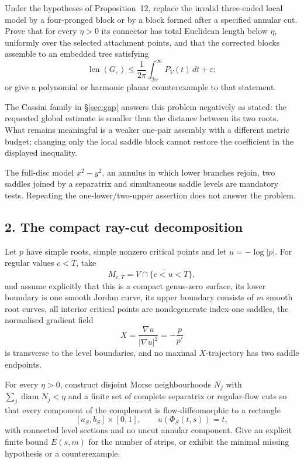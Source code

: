 \begin{problem}\label{prob:saddle1041}
Under the hypotheses of Proposition~12, replace the invalid three-ended local
model by a four-pronged block or by a block formed after a specified annular
cut.  Prove that for every $\eta>0$ its connector has total Euclidean length
below $\eta$, uniformly over the selected attachment points, and that the
corrected blocks assemble to an embedded tree satisfying
\[
 \operatorname{len}(G_\varepsilon)
 \le\frac1{2\pi}\int_{2\alpha}^{\infty}P_V(t)\,dt+\varepsilon;
\]
or give a polynomial or harmonic planar counterexample to that statement.
\end{problem}

The Cassini family in \S\ref{sec:gap} answers this problem negatively as
stated: the requested global estimate is smaller than the distance between its
two roots.  What remains meaningful is a weaker one-pair assembly with a
different metric budget; changing only the local saddle block cannot restore
the coefficient in the displayed inequality.

The full-disc model $x^2-y^2$, an annulus in which lower branches rejoin, two
saddles joined by a separatrix and simultaneous saddle levels are mandatory
tests.  Repeating the one-lower/two-upper assertion does not answer the
problem.

\subsection*{2. The compact ray-cut decomposition}

Let $p$ have simple roots, simple nonzero critical points and let
$u=-\log|p|$.  For regular values $c<T$, take
\[
 M_{c,T}=\overline{V\cap\{c<u<T\}},
\]
and assume explicitly that this is a compact genus-zero surface, its lower
boundary is one smooth Jordan curve, its upper boundary consists of $m$ smooth
root curves, all interior critical points are nondegenerate index-one saddles,
the normalised gradient field
\[
 X=\frac{\nabla u}{|\nabla u|^2}=-\frac{p}{p'}
\]
is transverse to the level boundaries, and no maximal $X$-trajectory has two
saddle endpoints.

\begin{problem}\label{prob:reeb1041}
For every $\eta>0$, construct disjoint Morse neighbourhoods $N_j$ with
$\sum_j\operatorname{diam}N_j<\eta$ and a finite set of complete separatrix or
regular-flow cuts so that every component of the complement is flow-diffeomorphic
to a rectangle
\[
 [a_S,b_S]\times[0,1],\qquad u(\Phi_S(t,s))=t,
\]
with connected level sections and no uncut annular component.  Give an explicit
finite bound $E(s,m)$ for the number of strips, or exhibit the minimal missing
hypothesis or a counterexample.
\end{problem}

